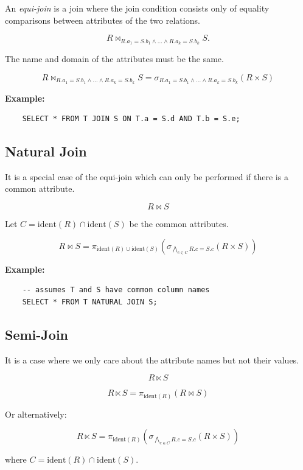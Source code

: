 An \emph{equi-join} is a join where the join condition consists only of equality comparisons between attributes of the two relations.

\[
    R \bowtie_{R.a_1 = S.b_1 \land \dots \land R.a_k = S.b_k} S.
\]

The name and domain of the attributes must be the same.

\[
    R \bowtie_{R.a_1 = S.b_1 \land \dots \land R.a_k = S.b_k} S = \sigma_{R.a_1 = S.b_1 \land \dots \land R.a_k = S.b_k}(R \times S)
\]

\textbf{Example:}

\begin{verbatim}
    SELECT * FROM T JOIN S ON T.a = S.d AND T.b = S.e;
\end{verbatim}

\subsection{Natural Join}

It is a special case of the equi-join which can only be performed if there is a common attribute.

\[
    R \bowtie S
\]

Let \(C = \mathrm{ident}(R) \cap \mathrm{ident}(S)\) be the common attributes.

\[
    R \bowtie S = \pi_{\mathrm{ident}(R) \cup \mathrm{ident}(S)}\left(\sigma_{\bigwedge_{c \in C} R.c = S.c}(R \times S)\right)
\]

\textbf{Example:}

\begin{verbatim}
    -- assumes T and S have common column names
    SELECT * FROM T NATURAL JOIN S;
\end{verbatim}

\subsection{Semi-Join}

It is a case where we only care about the attribute names but not their values.

\[
    R \ltimes S
\]

\[
    R \ltimes S = \pi_{\mathrm{ident}(R)}(R \bowtie S)
\]

Or alternatively:

\[
    R \ltimes S = \pi_{\mathrm{ident}(R)}\left(\sigma_{\bigwedge_{c \in C} R.c = S.c}(R \times S)\right)
\]

where \(C = \mathrm{ident}(R) \cap \mathrm{ident}(S)\).

